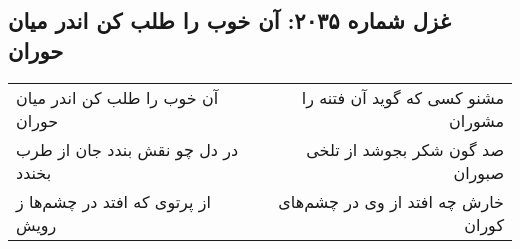 \begin{center}
\section*{غزل شماره ۲۰۳۵: آن خوب را طلب کن اندر میان حوران}
\label{sec:2035}
\begin{longtable}{l p{0.5cm} r}
آن خوب را طلب کن اندر میان حوران
&&
مشنو کسی که گوید آن فتنه را مشوران
\\
در دل چو نقش بندد جان از طرب بخندد
&&
صد گون شکر بجوشد از تلخی صبوران
\\
از پرتوی که افتد در چشم‌ها ز رویش
&&
خارش چه افتد از وی در چشم‌های کوران
\\
\end{longtable}
\end{center}
